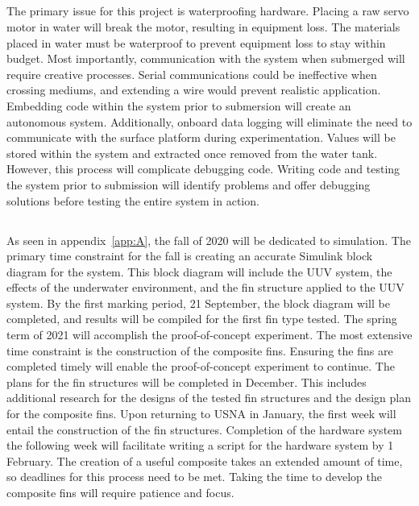 \documentclass[]{IEEEtran}
\begin{document}
\subsection{}
The primary issue for this project is waterproofing hardware.  Placing a raw servo motor in water will break the motor, resulting in equipment loss.  The materials placed in water must be waterproof to prevent equipment loss to stay within budget.  Most importantly, communication with the system when submerged will require creative processes.  Serial communications could be ineffective when crossing mediums, and extending a wire would prevent realistic application.  Embedding code within the system prior to submersion will create an autonomous system.  Additionally, onboard data logging will eliminate the need to communicate with the surface platform during experimentation.  Values will be stored within the system and extracted once removed from the water tank.  However, this process will complicate debugging code.  Writing code and testing the system prior to submission will identify problems and offer debugging solutions before testing the entire system in action.  

\subsection{}
As seen in appendix~\ref{app:A}, the fall of 2020 will be dedicated to simulation.  The primary time constraint for the fall is creating an accurate Simulink block diagram for the system.  This block diagram will include the UUV system, the effects of the underwater environment, and the fin structure applied to the UUV system.  By the first marking period, 21 September, the block diagram will be completed, and results will be compiled for the first fin type tested.  The spring term of 2021 will accomplish the proof-of-concept experiment.  The most extensive time constraint is the construction of the composite fins.  Ensuring the fins are completed timely will enable the proof-of-concept experiment to continue.  The plans for the fin structures will be completed in December.  This includes additional research for the designs of the tested fin structures and the design plan for the composite fins.  Upon returning to USNA in January, the first week will entail the construction of the fin structures.  Completion of the hardware system the following week will facilitate writing a script for the hardware system by 1 February.  The creation of a useful composite takes an extended amount of time, so deadlines for this process need to be met.  Taking the time to develop the composite fins will require patience and focus.  
\end{document}
